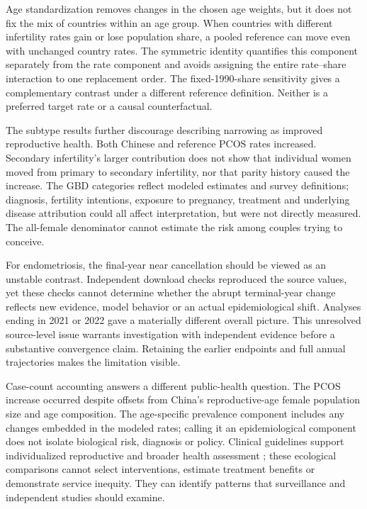 \documentclass[11pt,a4paper]{article}
\begin{document}
Age standardization removes changes in the chosen age weights, but it does not fix the mix of countries within an age group. When countries with different infertility rates gain or lose population share, a pooled reference can move even with unchanged country rates. The symmetric identity quantifies this component separately from the rate component and avoids assigning the entire rate--share interaction to one replacement order. The fixed-1990-share sensitivity gives a complementary contrast under a different reference definition. Neither is a preferred target rate or a causal counterfactual.

The subtype results further discourage describing narrowing as improved reproductive health. Both Chinese and reference PCOS rates increased. Secondary infertility's larger contribution does not show that individual women moved from primary to secondary infertility, nor that parity history caused the increase. The GBD categories reflect modeled estimates and survey definitions; diagnosis, fertility intentions, exposure to pregnancy, treatment and underlying disease attribution could all affect interpretation, but were not directly measured. The all-female denominator cannot estimate the risk among couples trying to conceive.

For endometriosis, the final-year near cancellation should be viewed as an unstable contrast. Independent download checks reproduced the source values, yet these checks cannot determine whether the abrupt terminal-year change reflects new evidence, model behavior or an actual epidemiological shift. Analyses ending in 2021 or 2022 gave a materially different overall picture. This unresolved source-level issue warrants investigation with independent evidence before a substantive convergence claim. Retaining the earlier endpoints and full annual trajectories makes the limitation visible.



Case-count accounting answers a different public-health question. The PCOS increase occurred despite offsets from China's reproductive-age female population size and age composition. The age-specific prevalence component includes any changes embedded in the modeled rates; calling it an epidemiological component does not isolate biological risk, diagnosis or policy. Clinical guidelines support individualized reproductive and broader health assessment \cite{pcos,eshre}; these ecological comparisons cannot select interventions, estimate treatment benefits or demonstrate service inequity. They can identify patterns that surveillance and independent studies should examine.
\end{document}
